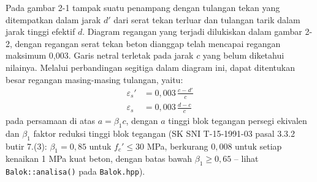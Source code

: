 

Pada gambar 2-1 tampak suatu penampang dengan tulangan tekan yang
ditempatkan dalam jarak $d'$ dari serat tekan terluar dan tulangan tarik
dalam jarak tinggi efektif $d$. Diagram regangan yang terjadi dilukiskan
dalam gambar 2-2, dengan regangan serat tekan beton dianggap telah mencapai
regangan maksimum 0,003. Garis netral terletak pada jarak $c$ yang belum
diketahui nilainya. Melalui perbandingan segitiga dalam diagram ini, dapat
ditentukan besar regangan masing-masing tulangan, yaitu:
\begin{align}
\varepsilon_s' &= 0{,}003\,\frac{c-d'}{c} \label{eq:2-7}\\
\varepsilon_s &= 0{,}003\,\frac{d-c}{c} \label{eq:2-8}
\end{align}
pada persamaan di atas $a = \beta_1 c$, dengan $a$ tinggi blok tegangan
persegi ekivalen dan $\beta_1$ faktor reduksi tinggi blok tegangan (SK SNI
T-15-1991-03 pasal 3.3.2 butir 7.(3): $\beta_1 = 0{,}85$ untuk $f_c' \le 30$
MPa, berkurang $0{,}008$ untuk setiap kenaikan 1 MPa kuat beton, dengan
batas bawah $\beta_1 \ge 0{,}65$ -- lihat \texttt{Balok::analisa()} pada
\texttt{Balok.hpp}).

